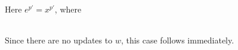 \item[\runa{Var}] Here $e^{p'}=x^{p'}$, where

\begin{figure}[H]
	\setlength\tabcolsep{8pt}
	\begin{tabular}{l}
		
	\end{tabular}
\end{figure}
Since there are no updates to $w$, this case follows immediately.
